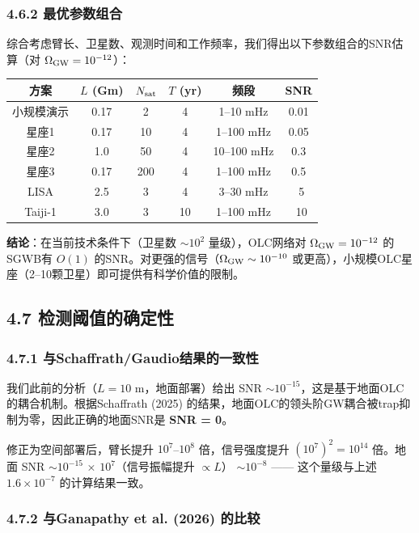 \documentclass[12pt,a4paper]{article}
\begin{document}
\subsubsection{4.6.2 最优参数组合}


综合考虑臂长、卫星数、观测时间和工作频率，我们得出以下参数组合的SNR估算（对 $\Omega_{\rm GW} = 10^{-12}$）：

\begin{tabular}{|c|c|c|c|c|c|}
\hline
方案 & $L$ (Gm) & $N_{\rm sat}$ & $T$ (yr) & 频段 & SNR \\
\hline
小规模演示 & 0.17 & 2 & 4 & 1–10 mHz & 0.01 \\
星座1 & 0.17 & 10 & 4 & 1–100 mHz & 0.05 \\
星座2 & 1.0 & 50 & 4 & 10–100 mHz & 0.3 \\
星座3 & 0.17 & 200 & 4 & 1–100 mHz & 0.5 \\
LISA & 2.5 & 3 & 4 & 3–30 mHz & ~5 \\
Taiji-1 & 3.0 & 3 & 10 & 1–100 mHz & ~10 \\
\hline
\end{tabular}


\textbf{结论}：在当前技术条件下（卫星数 $\sim 10^2$ 量级），OLC网络对 $\Omega_{\rm GW} = 10^{-12}$ 的SGWB有 $O(1)$ 的SNR。对更强的信号（$\Omega_{\rm GW} \sim 10^{-10}$ 或更高），小规模OLC星座（2–10颗卫星）即可提供有科学价值的限制。

\subsection{4.7 检测阈值的确定性}


\subsubsection{4.7.1 与Schaffrath/Gaudio结果的一致性}


我们此前的分析（$L = 10$ m，地面部署）给出 SNR $\sim 10^{-15}$，这是基于地面OLC的耦合机制。根据Schaffrath (2025) 的结果，地面OLC的领头阶GW耦合被trap抑制为零，因此正确的地面SNR是 \textbf{SNR = 0}。

修正为空间部署后，臂长提升 $10^7$–$10^8$ 倍，信号强度提升 $(10^7)^2 = 10^{14}$ 倍。地面 SNR $\sim 10^{-15}$ × $10^7$（信号振幅提升 $\propto L$） $\sim 10^{-8}$ —— 这个量级与上述 $1.6 \times 10^{-7}$ 的计算结果一致。

\subsubsection{4.7.2 与Ganapathy et al. (2026) 的比较}
\end{document}
